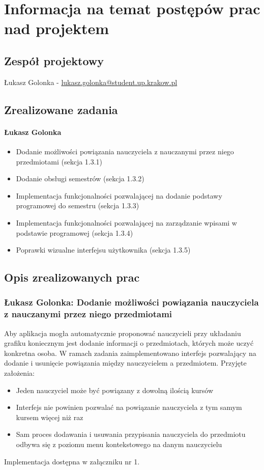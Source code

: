 \documentclass[12pt,a4paper,oneside]{article}
\theoremstyle{definition}
\numberwithin{equation}{section}
\begin{document}
\tableofcontents


\newpage

\section{Informacja na temat postępów prac nad projektem}
\subsection{Zespół projektowy}
Łukasz Golonka - \href{mailto:lukasz.golonka@student.up.krakow.pl}{lukasz.golonka@student.up.krakow.pl}
\subsection{Zrealizowane zadania}
\paragraph{Łukasz Golonka}
\begin{itemize}
	\item Dodanie możliwości powiązania nauczyciela z nauczanymi przez niego przedmiotami (sekcja 1.3.1)
	\item Dodanie obsługi semestrów (sekcja 1.3.2)
	\item Implementacja funkcjonalności pozwalającej na dodanie podstawy programowej do semestru (sekcja 1.3.3)
	\item Implementacja funkcjonalności pozwalającej na zarządzanie wpisami w podstawie programowej (sekcja 1.3.4)
	\item Poprawki wizualne interfejsu użytkownika (sekcja 1.3.5)
\end{itemize}

\subsection {Opis zrealizowanych prac}
\subsubsection{Łukasz Golonka: Dodanie możliwości powiązania nauczyciela z nauczanymi przez niego przedmiotami}
Aby aplikacja mogła automatycznie proponować nauczycieli przy układaniu  grafiku koniecznym jest dodanie informacji o przedmiotach, których może uczyć konkretna osoba.
W ramach zadania zaimplementowano interfejs pozwalający na dodanie i usunięcie powiązania między nauczycielem a przedmiotem.
Przyjęte założenia:
\begin{itemize}
	\item Jeden nauczyciel może być powiązany z dowolną ilością kursów
	\item Interfejs nie powinien pozwalać na powiązanie nauczyciela z tym samym kursem więcej niż raz
	\item Sam proces dodawania i usuwania przypisania nauczyciela do przedmiotu odbywa się z poziomu menu kontekstowego na danym nauczycielu
\end{itemize}
Implementacja dostępna w załączniku nr 1.
\end{document}
